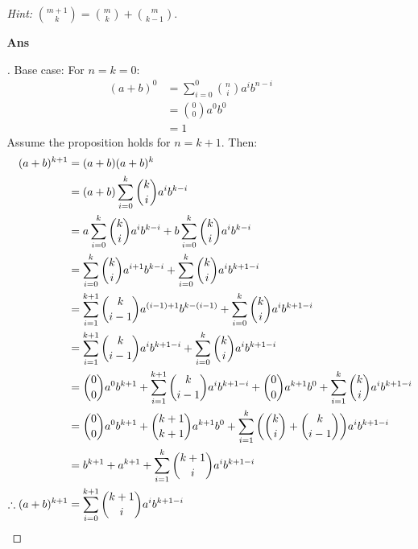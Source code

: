 \documentclass[paper=usletter, fontsize=12pt]{article}
\begin{document}
\begin{itemize}
\begin{itemize}
            \textit{Hint:} $\binom{m+1}{k}=\binom{m}{k}+\binom{m}{k-1}$.
            \item[\textbf{Ans}]
            \begin{proof}[\unskip\nopunct]
                Base case: For $n = k = 0$:
                \begin{align*}
                    (a + b)^0 & = \sum_{i=0}^{0} \binom{n}{i}a^{i}b^{n-i} \\
                    & = \binom{0}{0}a^{0}b^{0} \\
                    & = 1
                \end{align*}
                Assume the proposition holds for $n = k + 1$. Then:
                \begin{align*}
                    (a + b)^{k+1} & = (a + b)(a + b)^{k} \\
                    & = (a + b)\sum_{i=0}^{k} \binom{k}{i}a^{i}b^{k-i} \\
                    & = a\sum_{i=0}^{k} \binom{k}{i}a^{i}b^{k-i} +
                    b\sum_{i=0}^{k} \binom{k}{i}a^{i}b^{k-i} \\
                    & = \sum_{i=0}^{k} \binom{k}{i}a^{i+1}b^{k-i} +
                    \sum_{i=0}^{k} \binom{k}{i}a^{i}b^{k+1-i} \\
                    & = \sum_{i=1}^{k+1} \binom{k}{i-1}a^{(i-1)+1}b^{k-(i-1)} +
                    \sum_{i=0}^{k} \binom{k}{i}a^{i}b^{k+1-i} \\
                    & = \sum_{i=1}^{k+1} \binom{k}{i-1}a^{i}b^{k+1-i} +
                    \sum_{i=0}^{k} \binom{k}{i}a^{i}b^{k+1-i} \\
                    & = \binom{0}{0}a^{0}b^{k+1} + \sum_{i=1}^{k+1}
                    \binom{k}{i-1}a^{i}b^{k+1-i} + \binom{0}{0}a^{k+1}b^{0} +
                    \sum_{i=1}^{k} \binom{k}{i}a^{i}b^{k+1-i} \\
                    & = \binom{0}{0}a^{0}b^{k+1} + \binom{k+1}{k+1}a^{k+1}b^{0}
                    + \sum_{i=1}^{k}\bigg(\binom{k}{i} +
                      \binom{k}{i-1}\bigg)a^{i}b^{k+1-i} \\
                    & = b^{k+1} + a^{k+1} + \sum_{i=1}^{k}
                    \binom{k+1}{i}a^{i}b^{k+1-i} \\
                    \therefore (a + b)^{k+1} & =
                    \sum_{i=0}^{k+1}\binom{k+1}{i}a^{i}b^{k+1-i} \qedhere
                \end{align*}
            \end{proof}
            \vspace{0.2in}


\end{itemize}
\end{itemize}
\end{document}
